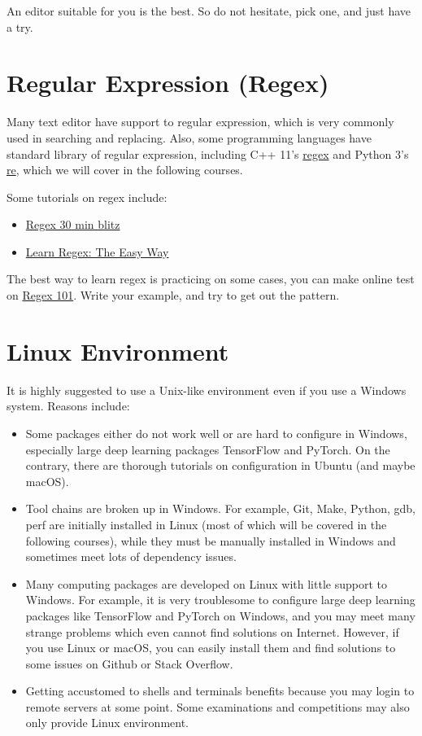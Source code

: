 \documentclass[english]{../TexTemplate/thesis}
\begin{document}
An editor suitable for you is the best.
So do not hesitate, pick one, and just have a try.

\section{Regular Expression (Regex)}
Many text editor have support to regular expression, which is very commonly used in searching and replacing.
Also, some programming languages have standard library of regular expression, including C++ 11's \href{http://www.cplusplus.com/reference/regex/}{regex} and Python 3's \href{https://docs.python.org/zh-cn/3.6/library/re.html}{re}, which we will cover in the following courses.

Some tutorials on regex include:
\begin{itemize}
	\item \href{https://deerchao.cn/tutorials/regex/regex.htm}{Regex 30 min blitz}
	\item \href{https://github.com/ziishaned/learn-regex}{Learn Regex: The Easy Way}
\end{itemize}

The best way to learn regex is practicing on some cases, you can make online test on \href{https://regex101.com}{Regex 101}.
Write your example, and try to get out the pattern.

\section{Linux Environment}
It is highly suggested to use a Unix-like environment even if you use a Windows system.
Reasons include:
\begin{itemize}
	\item Some packages either do not work well or are hard to configure in Windows, especially large deep learning packages TensorFlow and PyTorch. On the contrary, there are thorough tutorials on configuration in Ubuntu (and maybe macOS).
	\item Tool chains are broken up in Windows.
	For example, Git, Make, Python, gdb, perf are initially installed in Linux (most of which will be covered in the following courses), while they must be manually installed in Windows and sometimes meet lots of dependency issues.
	\item Many computing packages are developed on Linux with little support to Windows.
	For example, it is very troublesome to configure large deep learning packages like TensorFlow and PyTorch on Windows, and you may meet many strange problems which even cannot find solutions on Internet.
	However, if you use Linux or macOS, you can easily install them and find solutions to some issues on Github or Stack Overflow.
	\item Getting accustomed to shells and terminals benefits because you may login to remote servers at some point.
	Some examinations and competitions may also only provide Linux environment.
\end{itemize}
\end{document}
